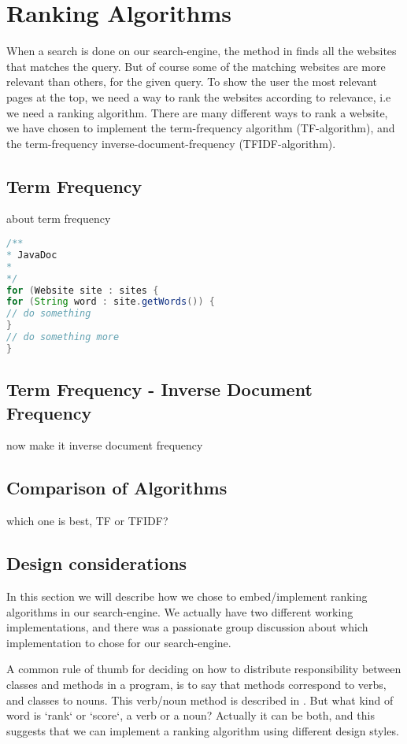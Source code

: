 \section{Ranking Algorithms}
When a search is done on our search-engine, the method  in  finds all the websites that matches the query. But of course some of the matching websites are more relevant than others, for the given query. To show the user the most relevant pages at the top, we need a way to rank the websites according to relevance, i.e we need a ranking algorithm. There are many different ways to rank a website, we have chosen to implement the term-frequency algorithm (TF-algorithm), and the term-frequency inverse-document-frequency (TFIDF-algorithm).    

\subsection{Term Frequency}
about term frequency

\begin{lstlisting}[language=Java, caption=This is a code example.]
/**
* JavaDoc
*
*/
for (Website site : sites {
for (String word : site.getWords()) {
// do something	
}
// do something more
}
\end{lstlisting}


\subsection{Term Frequency - Inverse Document Frequency}
now make it inverse document frequency

\subsection{Comparison of Algorithms}
which one is best, TF or TFIDF?


\subsection{Design considerations}
In this section we will describe how we chose to embed/implement ranking algorithms in our search-engine. We actually have two different working implementations, and there was a passionate group discussion about which implementation to chose for our search-engine.  

A common rule of thumb for deciding on how to distribute responsibility between classes and methods in a program, is to say that methods correspond to verbs, and classes to nouns. This verb/noun method is described in \cite[p.530]{BK}.
But what kind of word is `rank` or `score`, a verb or a noun? Actually it can be both, and this suggests that we can implement a ranking algorithm using different design styles.


